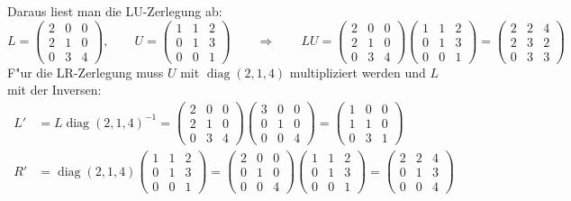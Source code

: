Daraus liest man die LU-Zerlegung ab:
\[
L
=
\begin{pmatrix}
2&0&0\\
2&1&0\\
0&3&4
\end{pmatrix},
\qquad
U
=
\begin{pmatrix}
1&1&2\\
0&1&3\\
0&0&1
\end{pmatrix}
\qquad
\Rightarrow
\qquad
LU=
\begin{pmatrix}
2&0&0\\
2&1&0\\
0&3&4
\end{pmatrix}
\begin{pmatrix}
1&1&2\\
0&1&3\\
0&0&1
\end{pmatrix}
=
\begin{pmatrix}
2&2&4\\
2&3&2\\
0&3&3
\end{pmatrix}
\]
F"ur die LR-Zerlegung muss $U$ mit $\operatorname{diag}(2,1,4)$
multipliziert werden und $L$ mit der Inversen:
\begin{align*}
L'
&=
L\operatorname{diag}(2,1,4)^{-1}
=
\begin{pmatrix}
2&0&0\\
2&1&0\\
0&3&4
\end{pmatrix}
\begin{pmatrix}
3&0&0\\
0&1&0\\
0&0&4
\end{pmatrix}
=
\begin{pmatrix}
1&0&0\\
1&1&0\\
0&3&1
\end{pmatrix}
\\
R'
&=
\operatorname{diag}(2,1,4)
\begin{pmatrix}
1&1&2\\
0&1&3\\
0&0&1
\end{pmatrix}
=
\begin{pmatrix}
2&0&0\\
0&1&0\\
0&0&4
\end{pmatrix}
\begin{pmatrix}
1&1&2\\
0&1&3\\
0&0&1
\end{pmatrix}
=
\begin{pmatrix}
2&2&4\\
0&1&3\\
0&0&4
\end{pmatrix}
\end{align*}

